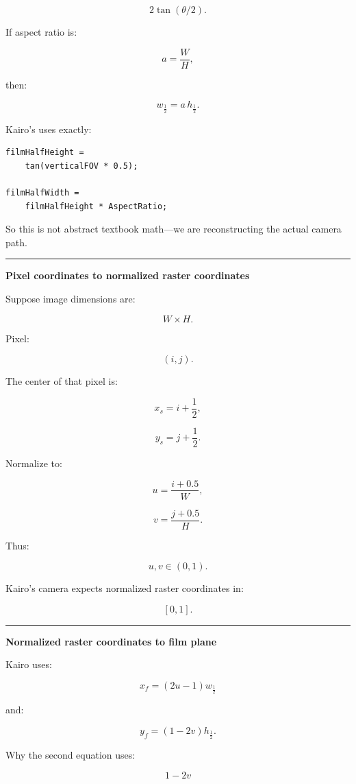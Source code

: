 \[
2\tan(\theta/2).
\]

If aspect ratio is:

\[
a=\frac{W}{H},
\]

then:

\[
\boxed{
w_{\frac12}
=
a\,h_{\frac12}.
}
\]

Kairo's  uses exactly:

\begin{verbatim}
filmHalfHeight =
    tan(verticalFOV * 0.5);

filmHalfWidth =
    filmHalfHeight * AspectRatio;
\end{verbatim}

So this is not abstract textbook math---we are reconstructing the actual camera path.

\begin{center}\rule{0.5\linewidth}{0.5pt}\end{center}

\textbf{Pixel coordinates to normalized raster coordinates}

Suppose image dimensions are:

\[
W\times H.
\]

Pixel:

\[
(i,j).
\]

The center of that pixel is:

\[
x_s=i+\frac12,
\]

\[
y_s=j+\frac12.
\]

Normalize to:

\[
u=\frac{i+0.5}{W},
\]

\[
v=\frac{j+0.5}{H}.
\]

Thus:

\[
u,v\in(0,1).
\]

Kairo's camera expects normalized raster coordinates in:

\[
[0,1].
\]

\begin{center}\rule{0.5\linewidth}{0.5pt}\end{center}

\textbf{Normalized raster coordinates to film plane}

Kairo uses:

\[
x_f=(2u-1)w_{\frac12}
\]

and:

\[
y_f=(1-2v)h_{\frac12}.
\]

Why the second equation uses:

\[
1-2v
\]

